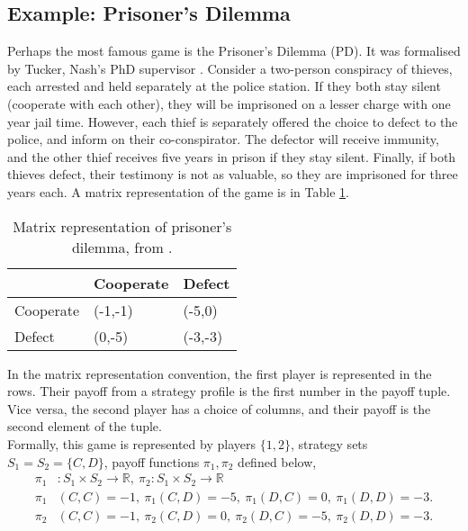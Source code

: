 \subsection{Example: Prisoner's Dilemma} \label{PD}
Perhaps the most famous game is the Prisoner's Dilemma (PD). It was formalised by Tucker, Nash's PhD supervisor \cite{RN82}. Consider a two-person conspiracy of thieves, each arrested and held separately at the police station. If they both stay silent (cooperate with each other), they will be imprisoned on a lesser charge with one year jail time. However, each thief is separately offered the choice to defect to the police, and inform on their co-conspirator. The defector will receive immunity, and the other thief receives five years in prison if they stay silent. Finally, if both thieves defect, their testimony is not as valuable, so they are imprisoned for three years each. A matrix representation of the game is in Table \ref{table:PD}. 

\begin{center}
\begin{table}[h]
\centering
\begin{tabular}{|l|l|l|}
\hline
          & Cooperate & Defect \\ \hline
Cooperate & (-1,-1)     & (-5,0)  \\ \hline
Defect    & (0,-5)     & (-3,-3)  \\ \hline
\end{tabular}
\caption{Matrix representation of prisoner's dilemma, from \cite{RN79}.}
\label{table:PD}
\end{table}
\end{center} 
In the matrix representation convention, the first player is represented in the rows. Their payoff from a strategy profile is the first number in the payoff tuple. Vice versa, the second player has a choice of columns, and their payoff is the second element of the tuple. \\

Formally, this game is represented by players $\{1,2\}$, strategy sets $S_1 = S_2 = \{C,D\}$, payoff functions $\pi_1, \pi_2$ defined below, 
\begin{align*}
    \pi_1& : S_1 \times S_2 \to \mathbb R, ~ \pi_2: S_1 \times S_2 \to \mathbb R\\
    \pi_1&(C,C) = -1,~ \pi_1(C,D) = -5,~ \pi_1(D,C) = 0,~ \pi_1(D,D) = -3.\\
    \pi_2&(C,C) = -1,~ \pi_2(C,D) = 0,~ \pi_2(D,C) = -5,~ \pi_2(D,D) = -3.\\
\end{align*}

